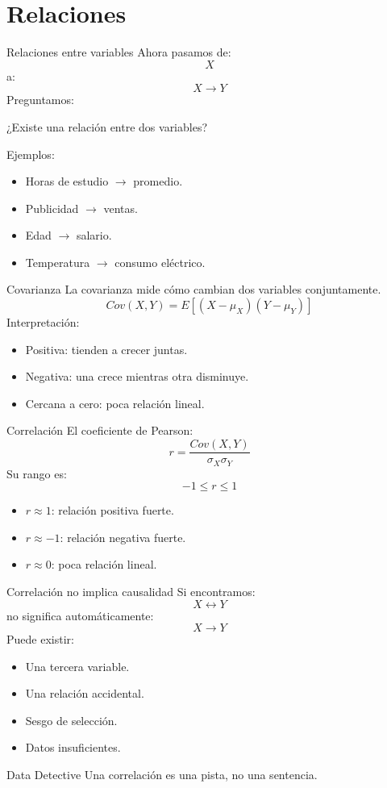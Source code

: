 \documentclass[aspectratio=169,11pt]{beamer}
\begin{document}
\section{Relaciones}
\begin{frame}{Relaciones entre variables}
Ahora pasamos de:
\[
X
\]
a:
\[
X \longrightarrow Y
\]
Preguntamos:
\begin{center}
¿Existe una relación entre dos variables?
\end{center}
Ejemplos:
\begin{itemize}
    \item Horas de estudio $\rightarrow$ promedio.
    \item Publicidad $\rightarrow$ ventas.
    \item Edad $\rightarrow$ salario.
    \item Temperatura $\rightarrow$ consumo eléctrico.
\end{itemize}
\end{frame}
\begin{frame}{Covarianza}
La covarianza mide cómo cambian dos variables conjuntamente.
\[
Cov(X,Y)
=
E[(X-\mu_X)(Y-\mu_Y)]
\]
Interpretación:
\begin{itemize}
    \item Positiva: tienden a crecer juntas.
    \item Negativa: una crece mientras otra disminuye.
    \item Cercana a cero: poca relación lineal.
\end{itemize}
\end{frame}
\begin{frame}{Correlación}
El coeficiente de Pearson:
\[
r =
\frac{Cov(X,Y)}
{\sigma_X\sigma_Y}
\]
Su rango es:
\[
-1\leq r\leq1
\]
\begin{itemize}
    \item $r\approx1$: relación positiva fuerte.
    \item $r\approx-1$: relación negativa fuerte.
    \item $r\approx0$: poca relación lineal.
\end{itemize}
\end{frame}
\begin{frame}{Correlación no implica causalidad}
Si encontramos:
\[
X \leftrightarrow Y
\]
no significa automáticamente:
\[
X \rightarrow Y
\]
Puede existir:
\begin{itemize}
    \item Una tercera variable.
    \item Una relación accidental.
    \item Sesgo de selección.
    \item Datos insuficientes.
\end{itemize}
\begin{alertblock}{Data Detective}
Una correlación es una pista, no una sentencia.
\end{alertblock}
\end{frame}
\end{document}
